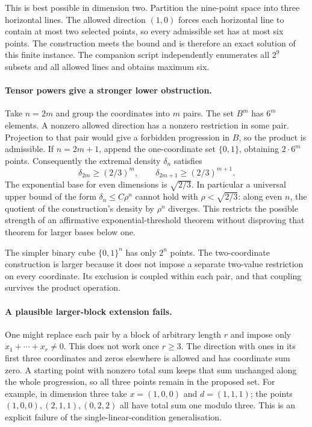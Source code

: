\documentclass[11pt,a4paper]{article}
\begin{document}
This is best possible in dimension two. Partition the nine-point space into three horizontal lines. The allowed direction $(1,0)$ forces each horizontal line to contain at most two selected points, so every admissible set has at most six points. The construction meets the bound and is therefore an exact solution of this finite instance. The companion script independently enumerates all $2^9$ subsets and all allowed lines and obtains maximum six.

\paragraph{Tensor powers give a stronger lower obstruction.}
Take $n=2m$ and group the coordinates into $m$ pairs. The set $B^m$ has $6^m$ elements. A nonzero allowed direction has a nonzero restriction in some pair. Projection to that pair would give a forbidden progression in $B$, so the product is admissible. If $n=2m+1$, append the one-coordinate set $\{0,1\}$, obtaining $2\cdot6^m$ points. Consequently the extremal density $\delta_n$ satisfies
\[
 \delta_{2m}\geq(2/3)^m,\qquad
 \delta_{2m+1}\geq(2/3)^{m+1}.
\]
The exponential base for even dimensions is $\sqrt{2/3}$. In particular a universal upper bound of the form $\delta_n\leq C\rho^n$ cannot hold with $\rho<\sqrt{2/3}$: along even $n$, the quotient of the construction's density by $\rho^n$ diverges. This restricts the possible strength of an affirmative exponential-threshold theorem without disproving that theorem for larger bases below one.

The simpler binary cube $\{0,1\}^n$ has only $2^n$ points. The two-coordinate construction is larger because it does not impose a separate two-value restriction on every coordinate. Its exclusion is coupled within each pair, and that coupling survives the product operation.

\paragraph{A plausible larger-block extension fails.}
One might replace each pair by a block of arbitrary length $r$ and impose only $x_1+\cdots+x_r\ne0$. This does not work once $r\geq3$. The direction with ones in its first three coordinates and zeros elsewhere is allowed and has coordinate sum zero. A starting point with nonzero total sum keeps that sum unchanged along the whole progression, so all three points remain in the proposed set. For example, in dimension three take $x=(1,0,0)$ and $d=(1,1,1)$; the points $(1,0,0),(2,1,1),(0,2,2)$ all have total sum one modulo three. This is an explicit failure of the single-linear-condition generalisation.
\end{document}
